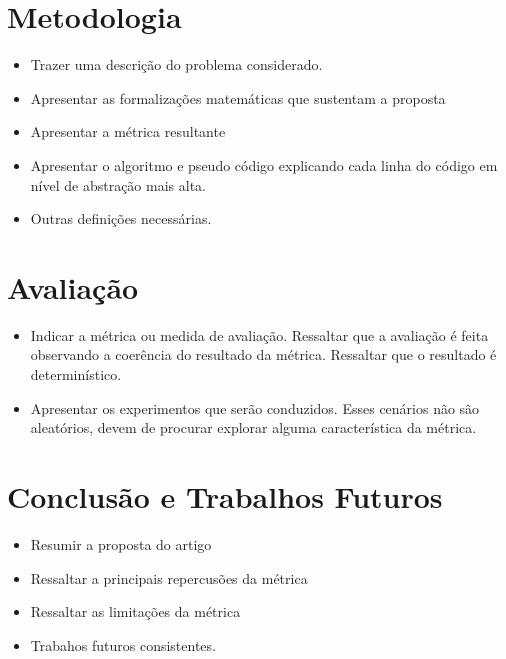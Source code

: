 \documentclass[preprint,12pt]{elsarticle}
\begin{document}
\section{Metodologia}
\label{sec:sample3}
\begin{itemize}
\item Trazer uma descrição do problema considerado. 
\item Apresentar as formalizações matemáticas que sustentam a proposta
\item Apresentar a métrica resultante
\item Apresentar o algoritmo e pseudo código explicando cada linha do código em nível de abstração mais alta. 
\item Outras definições necessárias.
\end{itemize}

\section{Avaliação}
\label{sec:sample4}
\begin{itemize}
\item Indicar a métrica ou medida de avaliação. Ressaltar que a avaliação é feita observando a coerência do resultado da métrica. Ressaltar que o resultado é determinístico. 
\item Apresentar os experimentos que serão conduzidos. Esses cenários não são aleatórios, devem de procurar explorar alguma característica da métrica.
\end{itemize}

\section{Conclusão e Trabalhos Futuros}
\label{sec:sample5}
\begin{itemize}
\item Resumir a proposta do artigo
\item Ressaltar a principais repercusões da métrica 
\item Ressaltar as limitações da métrica
\item Trabahos futuros consistentes.
\end{itemize}
\appendix

\end{document}
